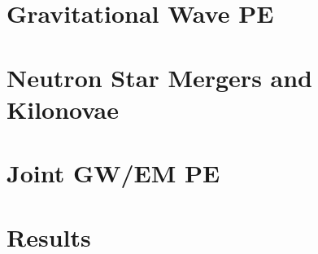 \documentclass{beamer}
\begin{document}
\section{Gravitational Wave PE}

\frame{
}

\section{Neutron Star Mergers and Kilonovae}

\frame{
}

\section{Joint GW/EM PE}

\frame{
}

\section{Results}

\frame{
}
\end{document}
